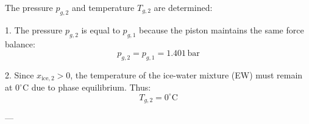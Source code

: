 The pressure \( p_{g,2} \) and temperature \( T_{g,2} \) are determined:  

1. The pressure \( p_{g,2} \) is equal to \( p_{g,1} \) because the piston maintains the same force balance:  
\[
p_{g,2} = p_{g,1} = 1.401 \, \text{bar}
\]  

2. Since \( x_{\text{ice},2} > 0 \), the temperature of the ice-water mixture (EW) must remain at \( 0^\circ\text{C} \) due to phase equilibrium. Thus:  
\[
T_{g,2} = 0^\circ\text{C}
\]  

---